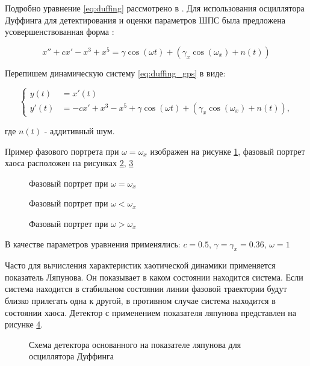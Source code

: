 Подробно уравнение \ref{eq:duffing} рассмотрено в \cite{chaos_neimark_landa}.
Для использования осциллятора Дуффинга для детектирования и оценки параметров ШПС была предложена усовершенствованная форма \cite{chaos_song, chaos_chen}:
\begin{center}
\begin{equation}
	\label{eq:duffing_gps}
	x'' +cx' - x^3 + x^5 = \gamma\cos(\omega{t}) + (\gamma_{x}\cos(\omega_{x}) + n(t))
\end{equation}
\end{center}

Перепишем динамическую систему \ref{eq:duffing_gps} в виде:
\begin{center}
\begin{equation}
	\label{eq:duffing_gps_2}
	\left\{
	\begin{aligned}
		y(t) & = x'(t) \\
		y'(t) & =  -cx' + x^3 - x^5 + \gamma\cos(\omega{t}) + (\gamma_{x}\cos(\omega_{x}) + n(t)),
	\end{aligned}
	\right.
\end{equation}
\end{center}
где ${n(t)}$ - аддитивный шум.

Пример фазового портрета при ${\omega=\omega_{x}}$ изображен на рисунке \ref{pic:duffing_sync},
фазовый портрет хаоса расположен на рисунках \ref{pic:duffing_chaos1}, \ref{pic:duffing_chaos2}
\begin{figure}[H]
	\center{}
	\caption{Фазовый портрет при ${\omega =\omega_{x}}$}
	\label{pic:duffing_sync}
\end{figure}
\begin{figure}[H]
	\center{}
	\caption{Фазовый портрет при ${\omega < \omega_{x}}$}
	\label{pic:duffing_chaos1}
\end{figure}
\begin{figure}[H]
	\center{}
	\caption{Фазовый портрет при ${\omega > \omega_{x}}$}
	\label{pic:duffing_chaos2}
\end{figure}
В качестве параметров уравнения применялись: $c = 0.5$, $\gamma=\gamma_{x}=0.36$, ${\omega=1}$

Часто для вычисления характеристик хаотической динамики применяется показатель Ляпунова.
Он показывает в каком состоянии находится система. Если система находится
в стабильном состоянии линии фазовой траектории будут близко прилегать одна к другой, в противном
случае система находится в состоянии хаоса. Детектор с применением показателя ляпунова
представлен на рисунке \ref{pic:chaos_lyapunov}.
\begin{figure}[H]
	\center{}
	\caption{Схема детектора основанного на показателе ляпунова для осциллятора Дуффинга}
	\label{pic:chaos_lyapunov}
\end{figure}

